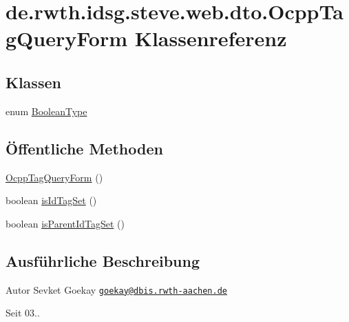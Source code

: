 \hypertarget{classde_1_1rwth_1_1idsg_1_1steve_1_1web_1_1dto_1_1_ocpp_tag_query_form}{\section{de.\-rwth.\-idsg.\-steve.\-web.\-dto.\-Ocpp\-Tag\-Query\-Form Klassenreferenz}
\label{classde_1_1rwth_1_1idsg_1_1steve_1_1web_1_1dto_1_1_ocpp_tag_query_form}
}
\subsection*{Klassen}
\begin{DoxyCompactItemize}
\item 
enum \hyperlink{enumde_1_1rwth_1_1idsg_1_1steve_1_1web_1_1dto_1_1_ocpp_tag_query_form_1_1_boolean_type}{Boolean\-Type}
\end{DoxyCompactItemize}
\subsection*{Öffentliche Methoden}
\begin{DoxyCompactItemize}
\item 
\hyperlink{classde_1_1rwth_1_1idsg_1_1steve_1_1web_1_1dto_1_1_ocpp_tag_query_form_ac94266acac17495329bb67c21a51321e}{Ocpp\-Tag\-Query\-Form} ()
\item 
boolean \hyperlink{classde_1_1rwth_1_1idsg_1_1steve_1_1web_1_1dto_1_1_ocpp_tag_query_form_ad80ab4e2b8102fbf51d4156d43bd82b1}{is\-Id\-Tag\-Set} ()
\item 
boolean \hyperlink{classde_1_1rwth_1_1idsg_1_1steve_1_1web_1_1dto_1_1_ocpp_tag_query_form_a7d5d727bfcd45659ff7efcc3692023c0}{is\-Parent\-Id\-Tag\-Set} ()
\end{DoxyCompactItemize}


\subsection{Ausführliche Beschreibung}
\begin{DoxyAuthor}{Autor}
Sevket Goekay \href{mailto:goekay@dbis.rwth-aachen.de}{\tt goekay@dbis.\-rwth-\/aachen.\-de} 
\end{DoxyAuthor}
\begin{DoxySince}{Seit}
03.. 
\end{DoxySince}


